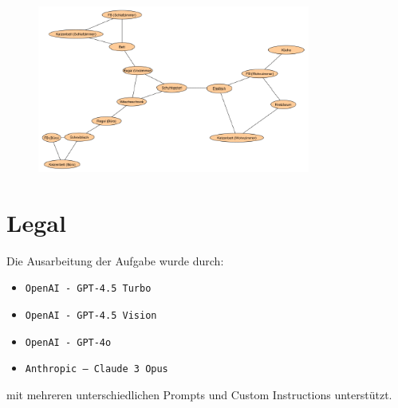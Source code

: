 \documentclass[a4paper,11pt]{report}
\begin{document}
    \begin{figure}[h]
        \centering
        \includegraphics[width=0.8\textwidth]{a07a_graph}
        \label{fig:a07_graph}
    \end{figure}


    \newpage

    \chapter{Legal}
    \label{ch:legal}
    Die Ausarbeitung der Aufgabe wurde durch:

    \begin{itemize}
        \item \texttt{OpenAI - GPT-4.5 Turbo}
        \item \texttt{OpenAI - GPT-4.5 Vision}
        \item \texttt{OpenAI - GPT-4o}
        \item \texttt{Anthropic -- Claude 3 Opus}
    \end{itemize}

    mit mehreren unterschiedlichen Prompts und Custom Instructions unterstützt.
\end{document}
